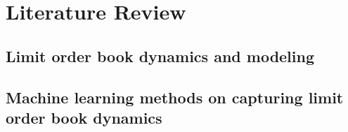 \chapter{Literature Review}
\section{Limit order book dynamics and modeling}


\section{Machine learning methods on capturing limit order book dynamics}

